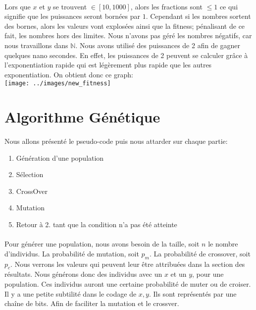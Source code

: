 \documentclass[a4paper, 11pt]{article}
\begin{document}
\paragraph{}
Lors que $x$ et $y$ se trouvent $\in [10,1000]$, alors les fractions sont $\le 1$ ce qui signifie que les puissances seront bornées par $1$.
Cependant si les nombres sortent des bornes, alors les valeurs vont explosées ainsi que la fitness; pénalisant de ce fait, les nombres hors
des limites. Nous n'avons pas géré les nombres négatifs, car nous travaillons dans $\mathbb{N}$.
Nous avons utilisé des puissances de 2 afin de gagner quelques nano secondes. En effet, les puissances de 2 peuvent se calculer grâce à 
l'exponentiation rapide qui est légèrement plus rapide que les autres exponentiation.
On obtient donc ce graph:\\
\texttt{[image: ../images/new\_fitness]}


\section{Algorithme Génétique}
\paragraph{}
Nous allons présenté le pseudo-code puis nous attarder sur chaque partie:
\begin{enumerate}
 \item Génération d'une population
 \item Sélection
 \item CrossOver
 \item Mutation
 \item Retour à 2. tant que la condition n'a pas été atteinte
\end{enumerate}

\paragraph{}
Pour générer une population, nous avons besoin de la taille, soit $n$  le nombre d'individus. La probabilité de mutation, soit $p_m$.
La probabilité de crossover, soit $p_c$.
Nous verrons les valeurs qui peuvent leur être attribuées dans la section des résultats.
Nous générons donc des individus avec un $x$ et un $y$, pour une population. Ces individus auront une certaine probabilité de muter ou de
croiser.
Il y a une petite subtilité dans le codage de $x,y$. Ils sont représentés par une chaîne de bits. Afin de faciliter la mutation et le
crossver.
\end{document}
